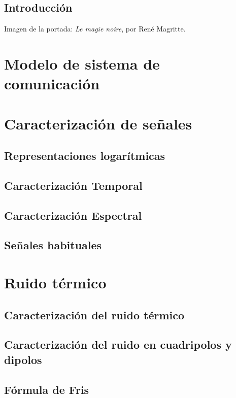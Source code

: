 \documentclass[a4paper]{book}
\begin{document}
\newpage
{}
{}
\section*{Introducción}
Imagen de la portada: \textsl{Le magie noire}, por René Magritte.
\newpage

\setlength{\parskip}{0em}
\tableofcontents 
\setlength{\parskip}{0.5em}

\chapter{Modelo de sistema de comunicación}

\chapter{Caracterización de señales}
\section{Representaciones logarítmicas}
\section{Caracterización Temporal}
\section{Caracterización Espectral}
\section{Señales habituales}

\chapter{Ruido térmico}
\section{Caracterización del ruido térmico}
\section{Caracterización del ruido en cuadripolos y dipolos}
\section{Fórmula de Fris}
\end{document}
